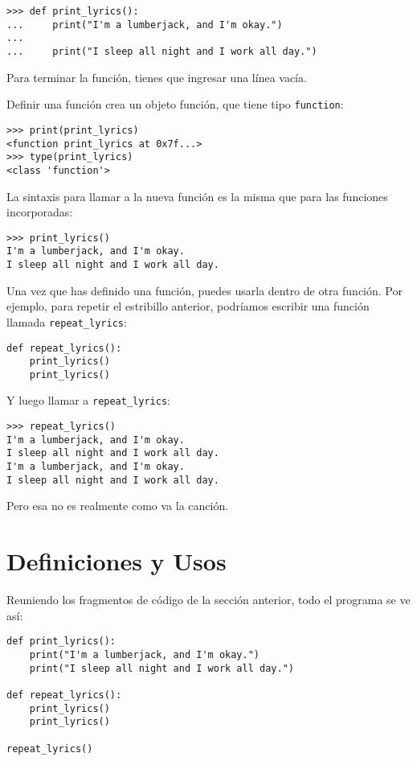 \begin{lstlisting}
>>> def print_lyrics():
...     print("I'm a lumberjack, and I'm okay.")
...     
...     print("I sleep all night and I work all day.")
\end{lstlisting}

Para terminar la función, tienes que ingresar una línea vacía.

Definir una función crea un objeto función, que tiene tipo \texttt{function}:

\begin{lstlisting}
>>> print(print_lyrics)
<function print_lyrics at 0x7f...>
>>> type(print_lyrics)
<class 'function'>
\end{lstlisting}

La sintaxis para llamar a la nueva función es la misma que para las funciones incorporadas:

\begin{lstlisting}
>>> print_lyrics()
I'm a lumberjack, and I'm okay.
I sleep all night and I work all day.
\end{lstlisting}

Una vez que has definido una función, puedes usarla dentro de otra función. Por ejemplo, para repetir el estribillo anterior, podríamos escribir una función llamada \texttt{repeat\_lyrics}:

\begin{lstlisting}
def repeat_lyrics():
    print_lyrics()
    print_lyrics()
\end{lstlisting}

Y luego llamar a \texttt{repeat\_lyrics}:

\begin{lstlisting}
>>> repeat_lyrics()
I'm a lumberjack, and I'm okay.
I sleep all night and I work all day.
I'm a lumberjack, and I'm okay.
I sleep all night and I work all day.
\end{lstlisting}

Pero esa no es realmente como va la canción.

\section{Definiciones y Usos}

Reuniendo los fragmentos de código de la sección anterior, todo el programa se ve así:

\begin{lstlisting}
def print_lyrics():
    print("I'm a lumberjack, and I'm okay.")
    print("I sleep all night and I work all day.")

def repeat_lyrics():
    print_lyrics()
    print_lyrics()

repeat_lyrics()
\end{lstlisting}

